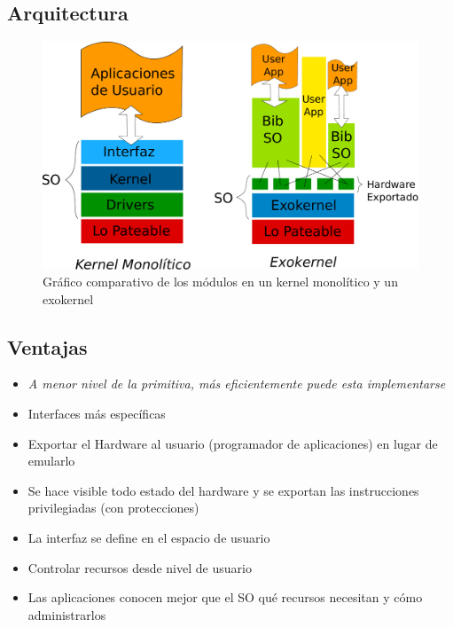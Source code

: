 \documentclass[10pt]{beamer}
\begin{document}
\subsection{Arquitectura}
\begin{frame}
\begin{figure}[H]
\centering
\includegraphics[scale=0.3]{grafico-kernel-exokernel.pdf}
\caption{Gráfico comparativo de los módulos en un kernel monolítico y un exokernel}
\end{figure}
\end{frame}

\subsection{Ventajas}
\begin{frame}
\begin{itemize}
  \item \emph{A menor nivel de la primitiva, más eficientemente puede esta implementarse}
  \item Interfaces más específicas
  \item Exportar el Hardware al usuario (programador de aplicaciones) en lugar de emularlo
  \item Se hace visible todo estado del hardware y se exportan las instrucciones privilegiadas (con protecciones)
  \item La interfaz se define en el espacio de usuario
  \item Controlar recursos desde nivel de usuario
  \item Las aplicaciones conocen mejor que el SO qué recursos necesitan y cómo administrarlos
\end{itemize}
\end{frame}
\end{document}
